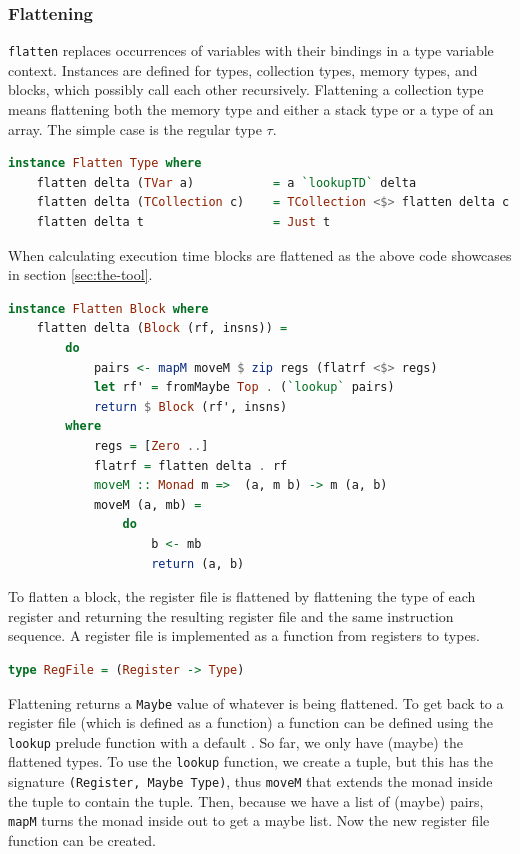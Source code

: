 \subsubsection{Flattening}
\texttt{flatten} replaces occurrences of variables with their bindings in a type
variable context.
Instances are defined for types, collection types, memory types, and blocks,
which possibly call each other recursively.
Flattening a collection type means flattening both the memory type and either a
stack type or a type of an array.
The simple case is the regular type $\tau$.
\begin{lstlisting}[language=haskell]
instance Flatten Type where
    flatten delta (TVar a)           = a `lookupTD` delta
    flatten delta (TCollection c)    = TCollection <$> flatten delta c
    flatten delta t                  = Just t
\end{lstlisting}

When calculating execution time blocks are flattened as the above code
showcases in section \ref{sec:the-tool}.
\begin{lstlisting}[language=haskell]
instance Flatten Block where
    flatten delta (Block (rf, insns)) =
        do
            pairs <- mapM moveM $ zip regs (flatrf <$> regs)
            let rf' = fromMaybe Top . (`lookup` pairs)
            return $ Block (rf', insns)
        where
            regs = [Zero ..]
            flatrf = flatten delta . rf
            moveM :: Monad m =>  (a, m b) -> m (a, b)
            moveM (a, mb) =
                do
                    b <- mb
                    return (a, b)
\end{lstlisting}
To flatten a block, the register file is flattened by flattening the type of
each register and returning the resulting register file and the same
instruction sequence.
A register file is implemented as a function from registers to types.
\begin{lstlisting}[language=haskell]
type RegFile = (Register -> Type)
\end{lstlisting}
Flattening returns a \texttt{Maybe} value of whatever is being
flattened. To get back to a register file (which is defined as a function) a
function can be defined using the \texttt{lookup} prelude function with a
default \ttop.
So far, we only have (maybe) the flattened types. To use the \texttt{lookup}
function, we create a tuple, but this has the signature \lstinline{(Register, Maybe Type)},
thus \texttt{moveM} that extends the monad inside the tuple to
contain the tuple.
Then, because we have a list of (maybe) pairs, \texttt{mapM} turns the monad
inside out to get a maybe list.
Now the new register file function can be created.

